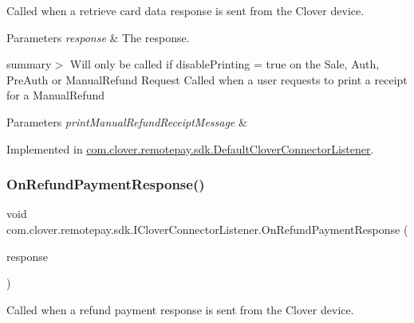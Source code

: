 Called when a retrieve card data response is sent from the Clover device. 


\begin{DoxyParams}{Parameters}
{\em response} & The response.\\
\hline
\end{DoxyParams}
summary$>$ Will only be called if disable\+Printing = true on the Sale, Auth, Pre\+Auth or Manual\+Refund Request Called when a user requests to print a receipt for a Manual\+Refund 


\begin{DoxyParams}{Parameters}
{\em print\+Manual\+Refund\+Receipt\+Message} & \\
\hline
\end{DoxyParams}


Implemented in \hyperlink{classcom_1_1clover_1_1remotepay_1_1sdk_1_1_default_clover_connector_listener_abf40aa043a50f59be9e36c3911ac895d}{com.\+clover.\+remotepay.\+sdk.\+Default\+Clover\+Connector\+Listener}.

\mbox{\label{interfacecom_1_1clover_1_1remotepay_1_1sdk_1_1_i_clover_connector_listener_a587ba1b1dfd1201e9225c7bc6323ad45}} 
\subsubsection{\texorpdfstring{On\+Refund\+Payment\+Response()}{OnRefundPaymentResponse()}}
{\footnotesize\ttfamily void com.\+clover.\+remotepay.\+sdk.\+I\+Clover\+Connector\+Listener.\+On\+Refund\+Payment\+Response (\begin{DoxyParamCaption}\item[{\hyperlink{classcom_1_1clover_1_1remotepay_1_1sdk_1_1_refund_payment_response}{Refund\+Payment\+Response}}]{response }\end{DoxyParamCaption})}



Called when a refund payment response is sent from the Clover device. 


